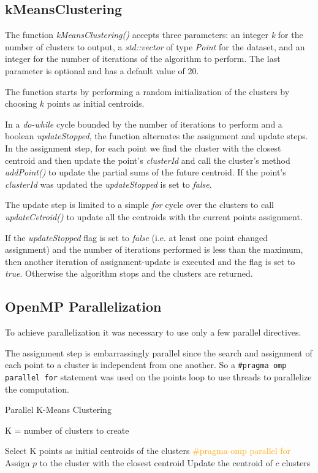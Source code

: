 \documentclass[10pt,twocolumn,letterpaper]{article}
\begin{document}
\subsection{kMeansClustering}
The function \textit{kMeansClustering()} accepts three parameters: an integer \textit{k} for the number of clusters to output, a \textit{std::vector} of type \textit{Point} for the dataset, and an integer for the number of iterations of the algorithm to perform. The last parameter is optional and has a default value of 20.

The function starts by performing a random initialization of the clusters by choosing $k$ points as initial centroids.

In a \textit{do-while} cycle bounded by the number of iterations to perform and a boolean \textit{updateStopped}, the function alternates the assignment and update steps.
In the assignment step, for each point we find the cluster with the closest centroid and then update the point's \textit{clusterId} and call the cluster's method \textit{addPoint()} to update the partial sums of the future centroid.
If the point's \textit{clusterId} was updated the \textit{updateStopped} is set to \textit{false}.

The update step is limited to a simple \textit{for} cycle over the clusters to call \textit{updateCetroid()} to update all the centroids with the current points assignment. 

If the \textit{updateStopped} flag is set to \textit{false} (i.e. at least one point changed assignment) and the number of iterations performed is less than the maximum, then another iteration of assignment-update is executed and the flag is set to \textit{true}. Otherwise the algorithm stops and the clusters are returned.

\subsection{OpenMP Parallelization}
To achieve parallelization it was necessary to use only a few parallel directives.

The assignment step is embarrassingly parallel since the search and assignment of each point to a cluster is independent from one another.
So a \verb"#pragma omp parallel for" statement was used on the points loop to use threads to parallelize the computation.

\begin{algorithm}
	\label{alg:KMeansAlgParallel}
	\caption{Parallel K-Means Clustering}
	\begin{algorithmic}
		\Require K = number of clusters to create
		\vspace{0.5cm}
		
		\State Select K points as initial centroids of the clusters
		\State \textcolor{orange}{\#pragma omp parallel for}
		\State Assign $p$ to the cluster with the closest centroid
		\EndFor
		\State Update the centroid of $c$
		\EndFor
		\EndWhile
		\State \Return clusters
		
	\end{algorithmic}
\end{algorithm}
\end{document}
